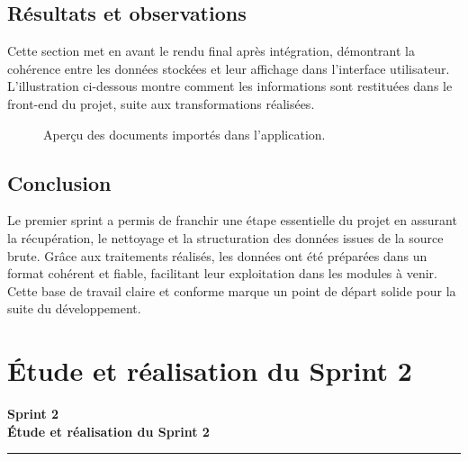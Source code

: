 \documentclass[a4paper,11pt]{report}
\begin{document}
\section{Résultats et observations}

Cette section met en avant le rendu final après intégration, démontrant la cohérence entre les données stockées et leur affichage dans l’interface utilisateur. L’illustration ci-dessous montre comment les informations sont restituées dans le front-end du projet, suite aux transformations réalisées.

\begin{figure}[H]
  \centering
  \setlength{\fboxrule}{1pt}
  \setlength{\fboxsep}{3pt}
  \caption{ Aperçu des documents importés dans l’application.\\}
  \label{fig:compass-preview}
\end{figure}
\section{Conclusion}
Le premier sprint a permis de franchir une étape essentielle du projet en assurant la récupération, le nettoyage et la structuration des données issues de la source brute. Grâce aux traitements réalisés, les données ont été préparées dans un format cohérent et fiable, facilitant leur exploitation dans les modules à venir. Cette base de travail claire et conforme marque un point de départ solide pour la suite du développement.




\newpage

\chapter{Étude et réalisation du Sprint 2}
\thispagestyle{empty}

\vspace{2cm}
\begin{center}
  {\Huge\bfseries Sprint 2}\\[0.8em]
  {\LARGE\bfseries Étude et réalisation du Sprint 2}
\end{center}

\vspace{1.5cm}
\begin{center}
  \color{blue!60!black}\rule{0.6\textwidth}{1pt}
\end{center}
\vspace{1.5cm}
\end{document}
